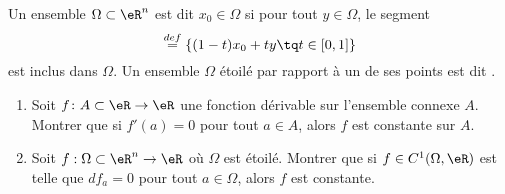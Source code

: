 
\begin{exercice}\label{exoTP20090001}

Un ensemble $\Omega\subset\eR^n$ est dit  $x_0\in\Omega$ si pour tout $y \in \Omega$, le segment
\begin{equation*}
	[x_0, y] \stackrel{def}{=} \{ (1-t) x_0 + t y \tq t \in  [0,1] \}
\end{equation*}
est inclus dans $\Omega$. Un ensemble $\Omega$ étoilé par rapport à un de ses points est dit .

\begin{enumerate}
\item
Soit $f\colon A\subset \eR\to\eR$ une fonction dérivable sur l'ensemble connexe $A$. Montrer que si $f'(a)=0$ pour tout $a\in A$, alors $f$ est constante sur $A$.

\item
Soit $f : \Omega \subset \eR^n \to \eR$ où $\Omega$ est étoilé. Montrer que si $f \in C^1(\Omega,{\eR})$ est telle que $df_a = 0$ pour tout $a \in \Omega$, alors $f$ est constante.

\end{enumerate}

\end{exercice}
